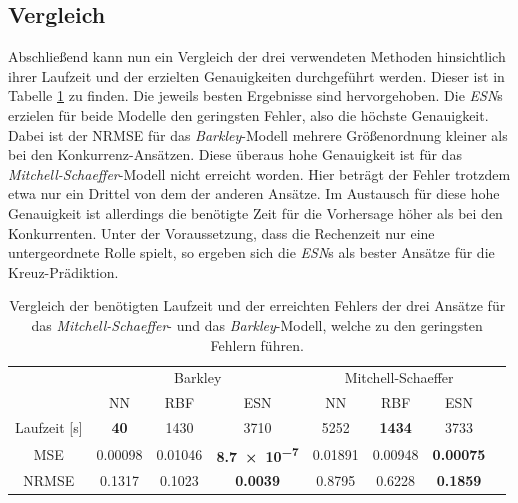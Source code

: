\FloatBarrier
\subsection{Vergleich}
Abschließend kann nun ein Vergleich der drei verwendeten Methoden hinsichtlich ihrer Laufzeit und der erzielten Genauigkeiten durchgeführt werden. Dieser ist in Tabelle \ref{tab:exp_cross_comparison_results} zu finden. Die jeweils  besten Ergebnisse sind hervorgehoben. Die \textit{ESN}s erzielen für beide Modelle den geringsten Fehler, also die höchste Genauigkeit. Dabei ist der NRMSE für das \textit{Barkley}-Modell mehrere Größenordnung kleiner als bei den Konkurrenz-Ansätzen. Diese überaus hohe Genauigkeit ist für das \textit{Mitchell-Schaeffer}-Modell nicht erreicht worden. Hier beträgt der Fehler trotzdem etwa nur ein Drittel von dem der anderen Ansätze. Im Austausch für diese hohe Genauigkeit ist allerdings die benötigte Zeit für die Vorhersage höher als bei den Konkurrenten. Unter der Voraussetzung, dass die Rechenzeit nur eine untergeordnete Rolle spielt, so ergeben sich die \textit{ESN}s als bester Ansätze für die Kreuz-Prädiktion.
\begin{table}[h]
	\centering
	\captionsetup{width=0.9\linewidth}
	\begin{tabular}{|c|c|c|c|c|c|c|c|}
		\multicolumn{1}{c|}{} & \multicolumn{3}{c|}{Barkley} & \multicolumn{3}{c|}{Mitchell-Schaeffer}		\\
		\cline{2-7}
		\multicolumn{1}{c|}{} & NN & RBF & ESN & NN & RBF & ESN \\
		
		\hline
		\hline
		
		Laufzeit [s] 	& \textbf{40} 		& 1430		& 3710		& 5252		& \textbf{1434} 		& 3733 \\
		\hline
		MSE 			& 0.00098	& 0.01046	& \textbf{\num{8.7e-7}} 	& 0.01891	& 0.00948 	& \textbf{0.00075} \\
		\hline
		NRMSE 			& 0.1317	& 0.1023	& \textbf{\num{0.0039}} 	& 0.8795	& 0.6228 	& \textbf{0.1859} \\
		\hline 
	\end{tabular} 
	\caption{Vergleich der benötigten Laufzeit und der erreichten Fehlers der drei Ansätze für das \textit{Mitchell-Schaeffer}- und das \textit{Barkley}-Modell, welche zu den geringsten Fehlern führen.}
	\label{tab:exp_cross_comparison_results}
\end{table}

\FloatBarrier